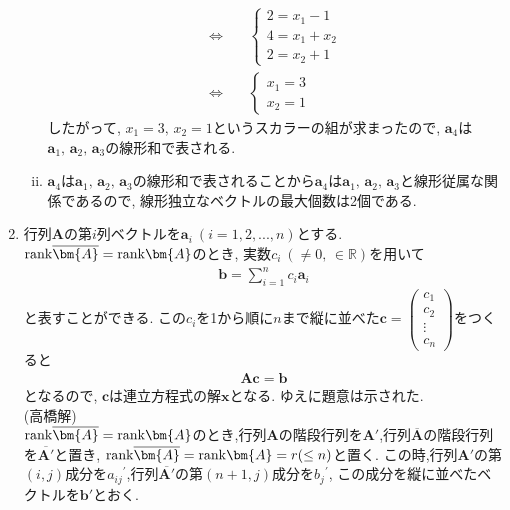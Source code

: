 \documentclass[dvipdfmx,titlepage, 11pt, a4paper]{jsarticle}%
\begin{document}
\begin{enumerate}[(1)]
\begin{enumerate}[(i)]
\begin{eqnarray*}
			            \Longleftrightarrow\ &&\left\{\begin{array}{l}
				            2=x_{1}-1     \\
				            4=x_{1}+x_{2} \\
				            2=x_{2}+1
			            \end{array}
			            \right.\\
			            \Longleftrightarrow\ && \left\{\begin{array}{l}
				            x_{1}=3 \\
				            x_{2}=1
			            \end{array}
			            \right.
		            \end{eqnarray*}
		            したがって, $x_{1}=3,\,x_{2}=1$というスカラーの組が求まったので, $\bm{a}_{4}$は$\bm{a}_{1},\,\bm{a}_{2},\,\bm{a}_{3}$の線形和で表される.
		      \item $\bm{a}_{4}$は$\bm{a}_{1},\,\bm{a}_{2},\,\bm{a}_{3}$の線形和で表されることから$\bm{a}_{4}$は$\bm{a}_{1},\,\bm{a}_{2},\,\bm{a}_{3}$と線形従属な関係であるので, 線形独立なベクトルの最大個数は2個である.
	      \end{enumerate}
	\item 行列$\bm{A}$の第$i$列ベクトルを$\bm{a}_{i}\ (i=1,2,...,n)$とする. ${\rm rank}\overline{\bm{A}}={\rm rank}\bm{A}$のとき, 実数$c_{i}\ (\neq 0,\,\in \mathbb{R})$を用いて
	      \begin{eqnarray*}
		      \bm{b}=\sum_{i=1}^{n}c_{i}\bm{a}_{i}
	      \end{eqnarray*}
	      と表すことができる. この$c_{i}$を1から順に$n$まで縦に並べた$\bm{c}=\begin{pmatrix}c_{1}\\c_{2}\\\vdots\\c_{n}\end{pmatrix}$をつくると
	      \begin{eqnarray*}
		      \bm{Ac}=\bm{b}
	      \end{eqnarray*}
		  となるので, $\bm{c}$は連立方程式の解$\bm{x}$となる. ゆえに題意は示された.\\[1cm]
		  (高橋解)\\
		  ${\rm rank}\overline{\bm{A}}={\rm rank}\bm{A}$のとき,行列$\bm{A}$の階段行列を$\bm{A'}$,行列$\overline{\bm{A}}$の階段行列を$\overline{\bm{A'}}$と置き,
		  ${\rm rank}\overline{\bm{A}}={\rm rank}\bm{A} = r(\leq n)$と置く.
		  この時,行列$\bm{A'}$の第$(i, j)$成分を$a_{ij}{}^{'}$,行列$\overline{\bm{A'}}$の第$(n + 1, j)$成分を$b_{j}{}^{'}$, この成分を縦に並べたベクトルを$\bm{b'}$とおく.

\end{enumerate}
\end{document}
